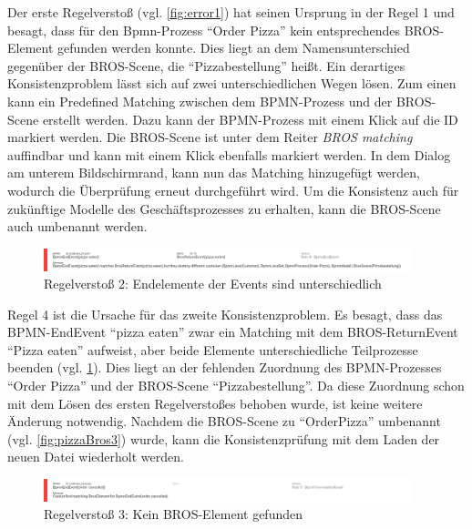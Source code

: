 Der erste Regelverstoß (vgl. \cref{fig:error1}) hat seinen Ursprung in der Regel 1 und besagt, dass für den Bpmn-Prozess ``Order Pizza'' kein entsprechendes BROS-Element gefunden werden konnte.
Dies liegt an dem Namensunterschied gegenüber der BROS-Scene, die ``Pizzabestellung'' heißt.
Ein derartiges Konsistenzproblem lässt sich auf zwei unterschiedlichen Wegen lösen.
Zum einen kann ein Predefined Matching zwischen dem BPMN-Prozess und der BROS-Scene erstellt werden.
Dazu kann der BPMN-Prozess mit einem Klick auf die ID markiert werden.
Die BROS-Scene ist unter dem Reiter \emph{BROS matching} auffindbar und kann mit einem Klick ebenfalls markiert werden.
In dem Dialog am unterem Bildschirmrand, kann nun das Matching hinzugefügt werden, wodurch die Überprüfung erneut durchgeführt wird.
Um die Konsistenz auch für zukünftige Modelle des Geschäftsprozesses zu erhalten, kann die BROS-Scene auch umbenannt werden.

\begin{figure}[H]
    \centering
     \includegraphics[width=0.95\textwidth,keepaspectratio]{../images/example/error2.png}%
    \caption{Regelverstoß 2: Endelemente der Events sind unterschiedlich}%
    \label{fig:error2}
\end{figure}

Regel 4 ist die Ursache für das zweite Konsistenzproblem.
Es besagt, dass das BPMN-EndEvent ``pizza eaten'' zwar ein Matching mit dem BROS-ReturnEvent ``Pizza  eaten'' aufweist, aber beide Elemente unterschiedliche Teilprozesse beenden (vgl. \cref{fig:error2}).
Dies liegt an der fehlenden Zuordnung des BPMN-Prozesses ``Order Pizza'' und der BROS-Scene ``Pizzabestellung''.
Da diese Zuordnung schon mit dem Lösen des ersten Regelverstoßes behoben wurde, ist keine weitere Änderung notwendig.
Nachdem die BROS-Scene zu ``OrderPizza'' umbenannt (vgl. \cref{fig:pizzaBros3}) wurde, kann die Konsistenzprüfung mit dem Laden der neuen Datei wiederholt werden.

\begin{figure}[H]
    \centering
    \includegraphics[width=0.95\textwidth,keepaspectratio]{../images/example/error3.png}%
    \caption{Regelverstoß 3: Kein BROS-Element gefunden}%
    \label{fig:error3}
\end{figure}

